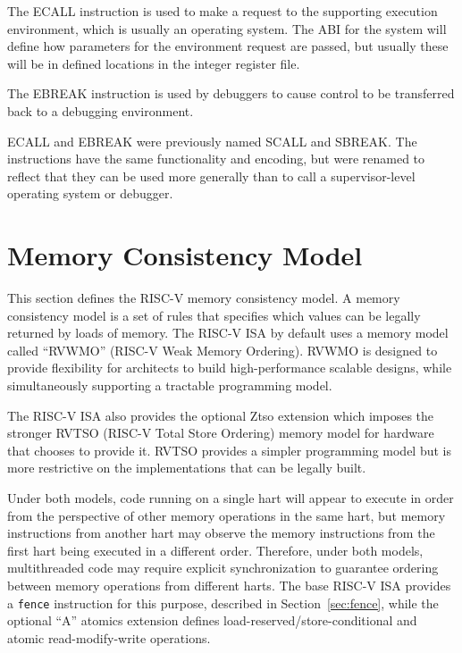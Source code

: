 The ECALL instruction is used to make a request to the supporting
execution environment, which is usually an operating system.  The ABI
for the system will define how parameters for the environment request
are passed, but usually these will be in defined locations in the
integer register file.

The EBREAK instruction is used by debuggers to cause control to be
transferred back to a debugging environment.

\begin{commentary}
ECALL and EBREAK were previously named SCALL and SBREAK.  The
instructions have the same functionality and encoding, but were
renamed to reflect that they can be used more generally than to call a
supervisor-level operating system or debugger.
\end{commentary}

\section{Memory Consistency Model}

This section defines the RISC-V memory consistency model.
A memory consistency model is a set of rules that specifies which values can be legally returned by loads of memory.
The RISC-V ISA by default uses a memory model called ``RVWMO'' (RISC-V Weak Memory Ordering).
RVWMO is designed to provide flexibility for architects to build high-performance scalable designs, while simultaneously supporting a tractable programming model.

The RISC-V ISA also provides the optional Ztso extension which imposes the stronger RVTSO (RISC-V Total Store Ordering) memory model for hardware that chooses to provide it.
RVTSO provides a simpler programming model but is more restrictive on the implementations that can be legally built.

Under both models, code running on a single hart will appear to execute in order from the perspective of other memory operations in the same hart, but memory instructions from another hart may observe the memory instructions from the first hart being executed in a different order.
Therefore, under both models, multithreaded code may require explicit synchronization to guarantee ordering between memory operations from different harts.
The base RISC-V ISA provides a {\tt fence} instruction for this purpose, described in Section~\ref{sec:fence}, while the optional ``A'' atomics extension defines load-reserved/store-conditional and atomic read-modify-write operations.

